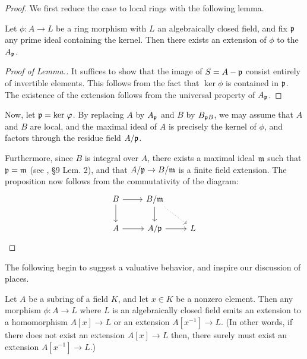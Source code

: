 \begin{proof}
We first reduce the case to local rings with the following lemma.

\begin{lem}
Let $\phi : A \to L$ be a ring morphism with $L$ an algebraically
closed field, and fix $\mathfrak{p}$ any prime ideal containing the
kernel. Then there exists an extension of $\phi$ to the 
$A_{\mathfrak{p}}$.
\end{lem}
\begin{proof}[Proof of Lemma.]
It suffices to show that the image of $S = A - \mathfrak{p}$ consist
entirely of invertible elements. This follows from the fact that
$\ker \phi$ is contained in $\mathfrak{p}$. The existence of the
extension follows from the universal property of $A_{\mathfrak{p}}$.
\end{proof}

Now, let $\mathfrak{p} = \mathrm{ker}\; \varphi$. By replacing $A$ by $A_{\mathfrak{p}}$
and $B$ by $B_{\mathfrak{p}B}$, we may assume that $A$ and $B$ are
local, and the maximal ideal of $A$ is precisely the kernel of $\phi$,
and factors through the residue field $A/\mathfrak{p}$.

Furthermore, since $B$ is integral over $A$, there exists a maximal
ideal $\mathfrak{m}$ such that $\mathfrak{p} = \mathfrak{m}$ (see 
\cite{MatsCA}, \S9 Lem. 2), and that $A/\mathfrak{p} \to B/\mathfrak{m}$ is
a finite field extension. The proposition now follows from the
commutativity of the diagram:
\[
\begin{tikzcd}
B \arrow{r} \arrow{d} 
& B/\ideal{m} \arrow{d} \arrow[dotted]{rd} \\
A \arrow{r} 
& A/\ideal{p} \arrow{r}
& L
\end{tikzcd}
\]
\end{proof}

The following begin to suggest a valuative behavior, and inspire 
our discussion of places.

\begin{prop}\label{thm_lang_3_2}
Let $A$ be a subring of a field $K$, and let $x \in K$ be a 
nonzero element. Then any morphism $\phi: A \to L$ where $L$ is an 
algebraically closed field emits an extension to a homomorphism 
$A[x] \to L$ or an extension $A[x^{-1}] \to L$. (In other words, 
if there does not exist an extension $A[x] \to L$ then, there surely
must exist an extension $A[x^{-1}] \to L$.)
\end{prop}
